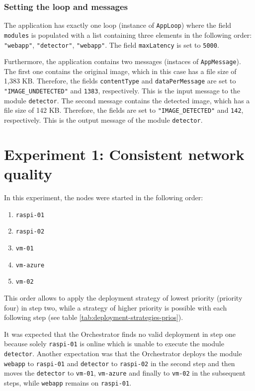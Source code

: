 \subsubsection*{Setting the loop and messages}
The application has exactly one loop (instance of \texttt{AppLoop}) where the field \texttt{modules} is populated with a list containing three elements in the following order:
\texttt{"webapp"}, \texttt{"detector"}, \texttt{"webapp"}.
The field \texttt{maxLatency} is set to \texttt{5000}.

Furthermore, the application contains two messages (instaces of \texttt{AppMessage}).
The first one contains the original image, which in this case has a file size of 1,383 KB. Therefore, the fields \texttt{contentType} and \texttt{dataPerMessage} are set to \texttt{"IMAGE\_UNDETECTED"} and  \texttt{1383}, respectively. This is the input message to the module \texttt{detector}.
The second message contains the detected image, which has a file size of 142 KB. Therefore, the fields are set to \texttt{"IMAGE\_DETECTED"} and \texttt{142}, respectively. This is the output message of the module \texttt{detector}.









\section{Experiment 1: Consistent network quality\label{sec:eval-exp-1}}

In this experiment, the nodes were started in the following order:
\begin{enumerate}
    \item \texttt{raspi-01}
    \item \texttt{raspi-02}
    \item \texttt{vm-01}
    \item \texttt{vm-azure}
    \item \texttt{vm-02}
\end{enumerate}
This order allows to apply the deployment strategy of lowest priority (priority four) in step two, while a strategy of higher priority is possible with each following step (see table \ref{tab:deployment-strategies-prios}).

It was expected that the Orchestrator finds no valid deployment in step one because solely \texttt{raspi-01} is online which is unable to execute the module \texttt{detector}.
Another expectation was that the Orchestrator deploys the module \texttt{webapp} to \texttt{raspi-01} and \texttt{detector} to \texttt{raspi-02} in the second step and then moves the \texttt{detector} to \texttt{vm-01}, \texttt{vm-azure} and finally to \texttt{vm-02} in the subsequent steps, while \texttt{webapp} remains on \texttt{raspi-01}.

